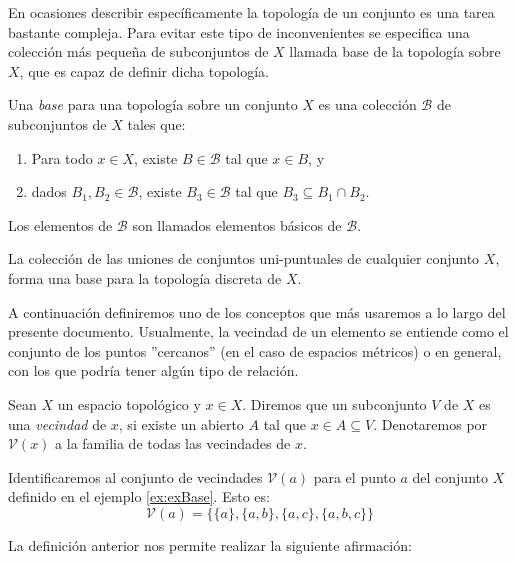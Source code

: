 En ocasiones describir específicamente la topología de un conjunto es una tarea bastante compleja. Para evitar este tipo de inconvenientes se especifica una colección más pequeña de subconjuntos de $X$ llamada base de la topología sobre $X$, que es capaz de definir dicha topología. 

\begin{definition}\label{def:base}
Una \textit{base} para una topología sobre un conjunto $X$ es una colección $\mathcal{B}$ de subconjuntos de $X$ tales que:
\begin{enumerate}
    \item Para todo $x\in X$, existe $B\in\mathcal{B}$ tal que $x\in B$, y
    \item dados $B_1,B_2\in\mathcal{B}$, existe $B_3\in\mathcal{B}$ tal que $B_3\subseteq B_1\cap B_2$.
\end{enumerate}
Los elementos de $\mathcal{B}$ son llamados elementos básicos de $\mathcal{B}$.
\end{definition}

\begin{example}\label{ex:conUnipuntuales}
La colección de las uniones de conjuntos uni-puntuales de cualquier conjunto $X$, forma una base para la topología discreta de $X$.
\end{example}

A continuación definiremos uno de los conceptos que más usaremos a lo largo del presente documento. Usualmente, la vecindad de un elemento se entiende como el conjunto de los puntos ''cercanos'' (en el caso de espacios métricos) o en general, con los que podría tener algún tipo de relación. 

\begin{definition}\label{def:vecindad}
Sean $X$ un espacio topológico y $x\in X$. Diremos que un subconjunto $V$ de $X$ es una \textit{vecindad} de $x$, si existe un abierto $A$ tal que $x\in A\subseteq V$. Denotaremos por $\mathcal{V}(x)$ a la familia de todas las vecindades de $x$.
\end{definition}

\begin{example}\label{ex:sisVecindades}
Identificaremos al conjunto de vecindades $\mathcal{V}(a)$ para el punto $a$ del conjunto $X$ definido en el ejemplo \ref{ex:exBase}. Esto es:
$$\mathcal{V}(a)=\{\{a\},\{a,b\},\{a,c\},\{a,b,c\}\}$$
\end{example}

La definición anterior nos permite realizar la siguiente afirmación:

